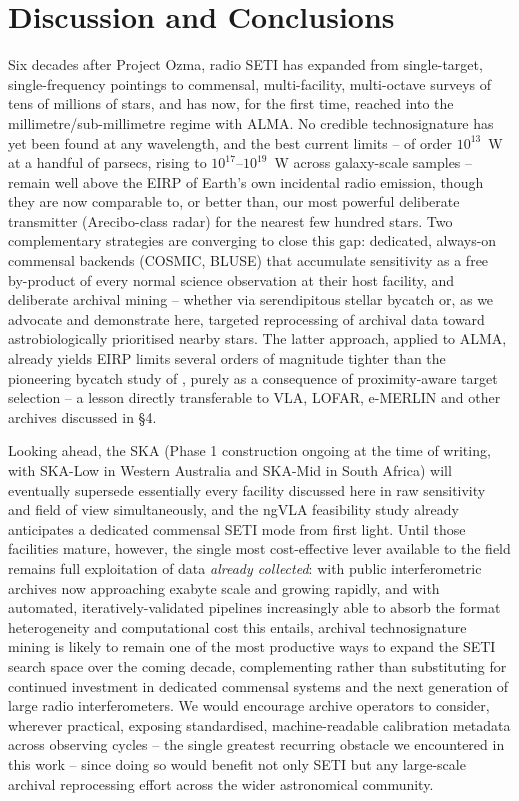 \documentclass[10pt,twocolumn]{article}
\begin{document}
\section{Discussion and Conclusions}
Six decades after Project Ozma, radio SETI has expanded from single-target, single-frequency pointings to commensal, multi-facility, multi-octave surveys of tens of millions of stars, and has now, for the first time, reached into the millimetre/sub-millimetre regime with ALMA. No credible technosignature has yet been found at any wavelength, and the best current limits -- of order $10^{13}$~W at a handful of parsecs, rising to $10^{17}$--$10^{19}$~W across galaxy-scale samples -- remain well above the EIRP of Earth's own incidental radio emission, though they are now comparable to, or better than, our most powerful deliberate transmitter (Arecibo-class radar) for the nearest few hundred stars. Two complementary strategies are converging to close this gap: dedicated, always-on commensal backends (COSMIC, BLUSE) that accumulate sensitivity as a free by-product of every normal science observation at their host facility, and deliberate archival mining -- whether via serendipitous stellar bycatch or, as we advocate and demonstrate here, targeted reprocessing of archival data toward astrobiologically prioritised nearby stars. The latter approach, applied to ALMA, already yields EIRP limits several orders of magnitude tighter than the pioneering bycatch study of \citet{mason2024}, purely as a consequence of proximity-aware target selection -- a lesson directly transferable to VLA, LOFAR, e-MERLIN and other archives discussed in \S4.

Looking ahead, the SKA (Phase 1 construction ongoing at the time of writing, with SKA-Low in Western Australia and SKA-Mid in South Africa) will eventually supersede essentially every facility discussed here in raw sensitivity and field of view simultaneously, and the ngVLA feasibility study \citep{ngvla2022} already anticipates a dedicated commensal SETI mode from first light. Until those facilities mature, however, the single most cost-effective lever available to the field remains full exploitation of data \emph{already collected}: with public interferometric archives now approaching exabyte scale and growing rapidly, and with automated, iteratively-validated pipelines increasingly able to absorb the format heterogeneity and computational cost this entails, archival technosignature mining is likely to remain one of the most productive ways to expand the SETI search space over the coming decade, complementing rather than substituting for continued investment in dedicated commensal systems and the next generation of large radio interferometers. We would encourage archive operators to consider, wherever practical, exposing standardised, machine-readable calibration metadata across observing cycles -- the single greatest recurring obstacle we encountered in this work -- since doing so would benefit not only SETI but any large-scale archival reprocessing effort across the wider astronomical community.
\end{document}
